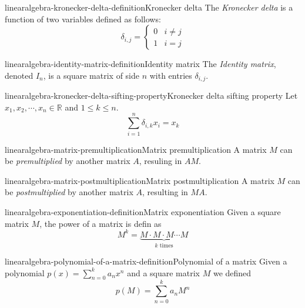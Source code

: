 \documentclass[preview]{standalone}
\begin{document}
\begin{snippetdefinition}{linearalgebra-kronecker-delta-definition}{Kronecker delta}
    The \textit{Kronecker delta} is a function of two variables
    defined as follows:
    \[
        \delta_{i,j} = \begin{cases}
            0 & i \neq j \\
            1 & i = j
        \end{cases}
    \]
\end{snippetdefinition}

\begin{snippetdefinition}{linearalgebra-identity-matrix-definition}{Identity matrix}
    The \textit{Identity matrix}, denoted \(I_n\),
    is a square matrix of side \(n\)
    with entries \(\delta_{i,j}\).
\end{snippetdefinition}

\begin{snippetproposition}{linearalgebra-kronecker-delta-sifting-property}{Kronecker delta sifting property}
    Let \(x_1, x_2, \cdots, x_n \in \mathbb{R}\)
    and \(1 \leq k \leq n\).
    \[
        \sum_{i=1}^n \delta_{i,k}x_i = x_k
    \]
\end{snippetproposition}

\begin{snippetdefinition}{linearalgebra-matrix-premultiplication}{Matrix premultiplication}
    A matrix \(M\) can be \textit{premultiplied}
    by another matrix \(A\), resuling in \(AM\).
\end{snippetdefinition}

\begin{snippetdefinition}{linearalgebra-matrix-postmultiplication}{Matrix postmultiplication}
    A matrix \(M\) can be \textit{postmultiplied}
    by another matrix \(A\), resulting in \(MA\).
\end{snippetdefinition}

\begin{snippetdefinition}{linearalgebra-exponentiation-definition}{Matrix exponentiation}
    Given a square matrix \(M\), the power of a matrix
    is defin as
    \[
        M^k = \underbrace{M\cdot M \cdot M \cdots M}_{k \text{ times}}
    \]
\end{snippetdefinition}

\begin{snippetdefinition}{linearalgebra-polynomial-of-a-matrix-definition}{Polynomial of a matrix}
    Given a polynomial \(p(x)=\sum_{n=0}^k a_nx^n\)
    and a square matrix \(M\) we defined
    \[
        p(M) = \sum_{n=0}^k a_nM^n
    \]
\end{snippetdefinition}
\end{document}
